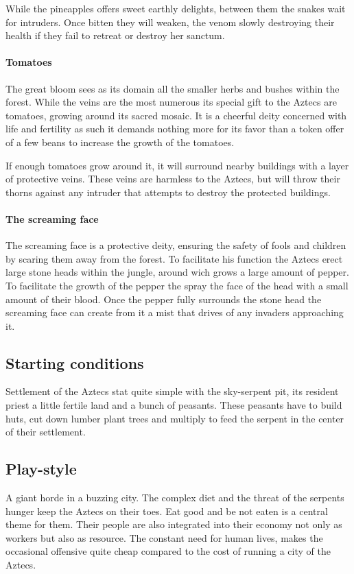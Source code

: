 \documentclass[a4paper]{book}
\begin{document}
				While the pineapples offers sweet earthly delights,
				between them the snakes wait for intruders.
				Once bitten they will weaken, the venom slowly destroying their health
				if they fail to retreat or destroy her sanctum.

			\paragraph{Tomatoes}
				The great bloom sees as its domain all the smaller herbs and bushes within the forest.
				While the veins are the most numerous its special gift to the \gls{Aztecs} are tomatoes,
				growing around its sacred mosaic.
				It is a cheerful deity concerned with life and fertility as such it demands
				nothing more for its favor than a token offer of a few beans to increase the growth of the tomatoes.

				If enough tomatoes grow around it,
				it will surround nearby buildings with a layer of protective veins.
				These veins are harmless to the \gls{Aztecs},
				but will throw their thorns against any intruder that attempts
				to destroy the protected buildings.

			\paragraph{The screaming face}
				The screaming face is a protective deity,
				ensuring the safety of fools and children by scaring them away from the forest.
				To facilitate his function the \gls{Aztecs} erect large stone heads within the jungle,
				around wich grows a large amount of pepper.
				To facilitate the growth of the pepper the spray the face of the head with a small amount of their blood.
				Once the pepper fully surrounds the stone head
				the screaming face can create from it a mist that drives of any invaders approaching it.

	\subsection{Starting conditions}
		Settlement of the \gls{Aztecs} stat quite simple with the sky-serpent pit,
		its resident priest a little fertile land and a bunch of peasants.
		These peasants have to build huts, cut down lumber plant trees and multiply
		to feed the serpent in the center of their settlement.

	\subsection{Play-style}
		A giant horde in a buzzing city.
		The complex diet and the threat of the serpents hunger keep the \gls{Aztecs} on their toes.
		Eat good and be not eaten is a central theme for them.
		Their people are also integrated into their economy not only as workers but also as resource.
		The constant need for human lives, makes the occasional offensive quite cheap
		compared to the cost of running a city of the \gls{Aztecs}.
\end{document}
